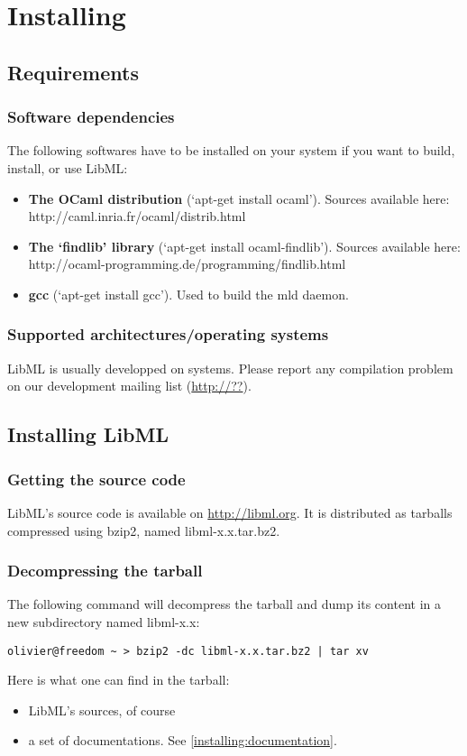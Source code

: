 \part{Installing}
\label{installing:part}

\chapter{Requirements}
\section{Software dependencies}
\label{installing:deps}
The following softwares have to be installed on your system if you want to
build, install, or use LibML:
\begin{itemize}
\item{\textbf{The OCaml distribution} (`apt-get install ocaml'). Sources available
here: http://caml.inria.fr/ocaml/distrib.html}
\item{\textbf{The `findlib' library} (`apt-get install ocaml-findlib'). Sources
available here: http://ocaml-programming.de/programming/findlib.html}
\item{\textbf{gcc} (`apt-get install gcc'). Used to build the mld daemon.}
\end{itemize}

\section{Supported architectures/operating systems}
LibML is usually developped on  systems. Please report any compilation problem on our development mailing list (\url{http://??}\cite{libml:mailinglist}).


\chapter{Installing LibML}
\label{installing:packaging}
\section{Getting the source code}
LibML's source code is available on \url{http://libml.org}\cite{libml:web}.
It is distributed as tarballs compressed using bzip2, named libml-x.x.tar.bz2.
\section{Decompressing the tarball}
The following command will decompress the tarball and dump its content in a
new subdirectory named libml-x.x:
\begin{verbatim}
olivier@freedom ~ > bzip2 -dc libml-x.x.tar.bz2 | tar xv
\end{verbatim}
Here is what one can find in the tarball:
\begin{itemize}
\item LibML's sources, of course
\item a set of documentations. See \vref{installing:documentation}.
\end{itemize}

